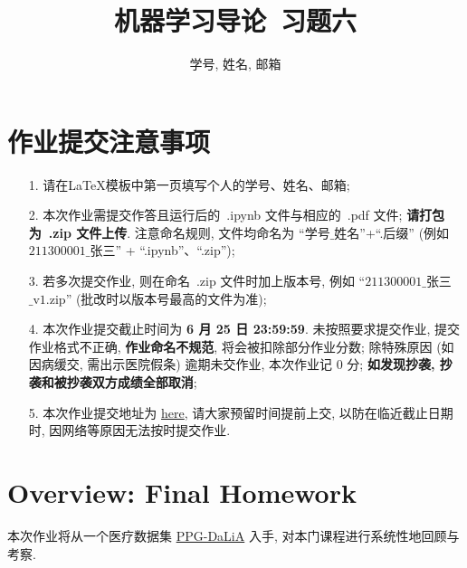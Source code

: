 \documentclass[a4paper,UTF8]{article}
\numberwithin{equation}{section}
\numberwithin{equation}{section}
\theoremstyle{definition}
\begin{document}
\title{机器学习导论\ 习题六}
\author{学号, 姓名, 邮箱}
\maketitle
\section*{作业提交注意事项}
\begin{tcolorbox}
	\begin{enumerate}
		\item[1.] 请在LaTeX模板中第一页填写个人的学号、姓名、邮箱;
		\item[2.] 本次作业需提交作答且运行后的~.ipynb 文件与相应的~.pdf 文件; {\color{red}\textbf{请打包为~.zip 文件上传}}. 注意命名规则, 文件均命名为 “$\text{学号}\_\text{姓名}$”+“.后缀” (例如 $\text{211300001}\_\text{张三}$” + “.ipynb”、“.zip”);
		\item[3.] 若多次提交作业, 则在命名~.zip 文件时加上版本号, 例如 “$\text{211300001}\_\text{张三}$ $\_\text{v1.zip}$” (批改时以版本号最高的文件为准);
		\item[4.] 本次作业提交截止时间为 {\color{red}\textbf{ 6 月 25 日 23:59:59}}. 未按照要求提交作业, 提交作业格式不正确, {\color{red}\textbf{作业命名不规范}}, 将会被扣除部分作业分数; 除特殊原因 (如因病缓交, 需出示医院假条) 逾期未交作业, 本次作业记 0 分; {\color{red}\textbf{如发现抄袭, 抄袭和被抄袭双方成绩全部取消}};
		\item[5.] 本次作业提交地址为 \href{https://box.nju.edu.cn/u/d/c03d48964e324ba28f6a/}{here}, 请大家预留时间提前上交, 以防在临近截止日期时, 因网络等原因无法按时提交作业.
	\end{enumerate}
\end{tcolorbox}
\newpage


\section*{Overview: Final Homework}

本次作业将从一个医疗数据集 \href{https://archive.ics.uci.edu/ml/datasets/PPG-DaLiA}{PPG-DaLiA} 入手, 对本门课程进行系统性地回顾与考察.
\end{document}

